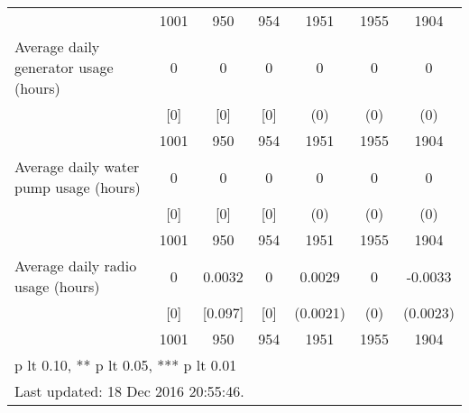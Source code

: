\begin{table}[htbp]
\begin{tabular*}{1\hsize}{@{\hskip\tabcolsep\extracolsep\fill}l*{1}{cccccc}}
                                &     1001&      950&      954&     1951         &     1955         &     1904         \\
Average daily generator usage (hours)&        0&        0&        0&        0         &        0         &        0         \\
                                &      [0]&      [0]&      [0]&      (0)         &      (0)         &      (0)         \\
                                &     1001&      950&      954&     1951         &     1955         &     1904         \\
Average daily water pump usage (hours)&        0&        0&        0&        0         &        0         &        0         \\
                                &      [0]&      [0]&      [0]&      (0)         &      (0)         &      (0)         \\
                                &     1001&      950&      954&     1951         &     1955         &     1904         \\
Average daily radio usage (hours)&        0&   0.0032&        0&   0.0029         &        0         &  -0.0033         \\
                                &      [0]&  [0.097]&      [0]& (0.0021)         &      (0)         & (0.0023)         \\
                                &     1001&      950&      954&     1951         &     1955         &     1904         \\
\bottomrule
\multicolumn{7}{l}{\footnotesize * p lt 0.10, ** p lt 0.05, *** p lt 0.01}\\
\multicolumn{7}{l}{\footnotesize Last updated: 18 Dec 2016 20:55:46.}\\
\end{tabular*}
\end{table}
